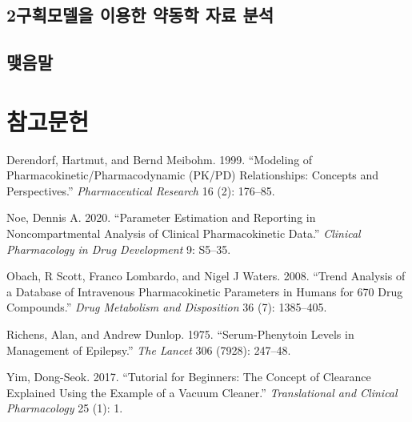 \documentclass[
  11pt,
  krantz2, a4paper, twoside]{krantz}
\newlength{\cslhangindent}
\newenvironment{CSLReferences}[2] %
 {%
  \setlength{\parindent}{0pt}
  \ifodd #1 \everypar{\setlength{\hangindent}{\cslhangindent}}\ignorespaces\fi
  \ifnum #2 > 0
  \setlength{\parskip}{#2\baselineskip}
  \fi
 }%
 {}
\begin{document}
\hypertarget{uxad6cuxd68duxbaa8uxb378uxc744-uxc774uxc6a9uxd55c-uxc57duxb3d9uxd559-uxc790uxb8cc-uxbd84uxc11d}{%
\section{2구획모델을 이용한 약동학 자료 분석}\label{uxad6cuxd68duxbaa8uxb378uxc744-uxc774uxc6a9uxd55c-uxc57duxb3d9uxd559-uxc790uxb8cc-uxbd84uxc11d}}

\hypertarget{uxb9fauxc74cuxb9d0-2}{%
\section{맺음말}\label{uxb9fauxc74cuxb9d0-2}}

\backmatter

\hypertarget{uxcc38uxace0uxbb38uxd5cc}{%
\chapter*{참고문헌}\label{uxcc38uxace0uxbb38uxd5cc}}


\hypertarget{refs}{}
\begin{CSLReferences}{1}{0}
\leavevmode{}%
Derendorf, Hartmut, and Bernd Meibohm. 1999. {``Modeling of Pharmacokinetic/Pharmacodynamic (PK/PD) Relationships: Concepts and Perspectives.''} \emph{Pharmaceutical Research} 16 (2): 176--85.

\leavevmode{}%
Noe, Dennis A. 2020. {``Parameter Estimation and Reporting in Noncompartmental Analysis of Clinical Pharmacokinetic Data.''} \emph{Clinical Pharmacology in Drug Development} 9: S5--35.

\leavevmode{}%
Obach, R Scott, Franco Lombardo, and Nigel J Waters. 2008. {``Trend Analysis of a Database of Intravenous Pharmacokinetic Parameters in Humans for 670 Drug Compounds.''} \emph{Drug Metabolism and Disposition} 36 (7): 1385--405.

\leavevmode{}%
Richens, Alan, and Andrew Dunlop. 1975. {``Serum-Phenytoin Levels in Management of Epilepsy.''} \emph{The Lancet} 306 (7928): 247--48.

\leavevmode{}%
Yim, Dong-Seok. 2017. {``Tutorial for Beginners: The Concept of Clearance Explained Using the Example of a Vacuum Cleaner.''} \emph{Translational and Clinical Pharmacology} 25 (1): 1.

\end{CSLReferences}

\printindex
\end{document}
